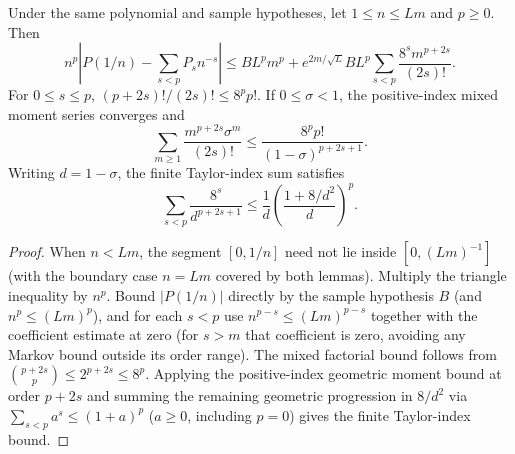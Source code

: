 \begin{lemma}
\label{lem:reciprocal-large-degree}
\leanok
{}
Under the same polynomial and sample hypotheses, let $1\le n\le Lm$
and $p\ge0$. Then
\[
 n^p\left|P(1/n)-\sum_{s<p}P_s n^{-s}\right|
 \le BL^pm^p+e^{2m/\sqrt L}BL^p
       \sum_{s<p}\frac{8^s m^{p+2s}}{(2s)!}.
\]
For $0\le s\le p$, $(p+2s)!/(2s)!\le8^p p!$.
If $0\le\sigma<1$, the positive-index mixed moment series converges and
\[
 \sum_{m\ge1}\frac{m^{p+2s}\sigma^m}{(2s)!}
 \le\frac{8^p p!}{(1-\sigma)^{p+2s+1}}.
\]
Writing $d=1-\sigma$, the finite Taylor-index sum satisfies
\[
 \sum_{s<p}\frac{8^s}{d^{p+2s+1}}
 \le\frac1d\left(\frac{1+8/d^2}{d}\right)^p.
\]
\end{lemma}
\begin{proof}
When $n < Lm$, the segment $[0, 1/n]$ need not lie inside $[0, (Lm)^{-1}]$ (with the boundary case $n = Lm$ covered by both lemmas). Multiply the triangle inequality by $n^p$. Bound $|P(1/n)|$ directly by the sample hypothesis $B$ (and $n^p \le (Lm)^p$),
and for each $s<p$ use $n^{p-s}\le(Lm)^{p-s}$ together with the coefficient estimate
at zero (for $s>m$ that coefficient is zero, avoiding any Markov bound outside its order range). The mixed factorial bound follows
from $\binom{p+2s}{p}\le2^{p+2s}\le8^p$. Applying the positive-index geometric
moment bound at order $p + 2s$ and summing the remaining geometric progression in $8/d^2$ via
$\sum_{s<p}a^s\le(1+a)^p$ ($a\ge0$, including $p=0$) gives the finite Taylor-index bound.
\end{proof}

